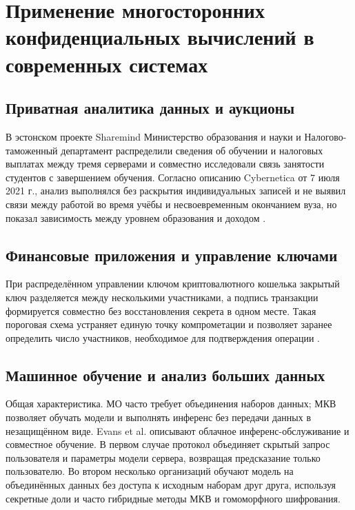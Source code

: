 \section{Применение многосторонних конфиденциальных вычислений в современных системах}
\label{sec:applications}

\subsection{Приватная аналитика данных и аукционы}

В эстонском проекте Sharemind Министерство образования и науки и Налогово-таможенный департамент распределили сведения об обучении и налоговых выплатах между тремя серверами и совместно исследовали связь занятости студентов с завершением обучения. Согласно описанию Cybernetica от 7 июля 2021 г., анализ выполнялся без раскрытия индивидуальных записей и не выявил связи между работой во время учёбы и несвоевременным окончанием вуза, но показал зависимость между уровнем образования и доходом \cite{18}.

\subsection{Финансовые приложения и управление ключами}

При распределённом управлении ключом криптовалютного кошелька закрытый ключ разделяется между несколькими участниками, а подпись транзакции формируется совместно без восстановления секрета в одном месте. Такая пороговая схема устраняет единую точку компрометации и позволяет заранее определить число участников, необходимое для подтверждения операции \cite{06}.

\subsection{Машинное обучение и анализ больших данных}
\label{subsec:ml-applications}

Общая характеристика. МО часто требует объединения наборов данных; МКВ позволяет обучать модели и выполнять инференс без передачи данных в незащищённом виде. Evans et al. описывают облачное инференс-обслуживание и совместное обучение. В первом случае протокол объединяет скрытый запрос пользователя и параметры модели сервера, возвращая предсказание только пользователю. Во втором несколько организаций обучают модель на объединённых данных без доступа к исходным наборам друг друга, используя секретные доли и часто гибридные методы МКВ и гомоморфного шифрования.

